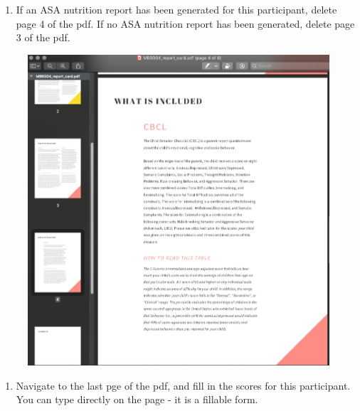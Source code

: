 \documentclass[]{book}
\providecommand{\tightlist}{%
  \setlength{\itemsep}{0pt}\setlength{\parskip}{0pt}}
\begin{document}
\begin{enumerate}
\def\labelenumi{\arabic{enumi}.}
\setcounter{enumi}{2}
\tightlist
\item
  If an ASA nutrition report has been generated for this participant, delete page 4 of the pdf. If no ASA nutrition report has been generated, delete page 3 of the pdf.
\end{enumerate}

\begin{figure}
\centering
\includegraphics{images/final_checklist/report_cards/3.png}
\caption{}
\end{figure}

\begin{enumerate}
\def\labelenumi{\arabic{enumi}.}
\setcounter{enumi}{3}
\tightlist
\item
  Navigate to the last pge of the pdf, and fill in the scores for this participant. You can type directly on the page - it is a fillable form.
\end{enumerate}
\end{document}
